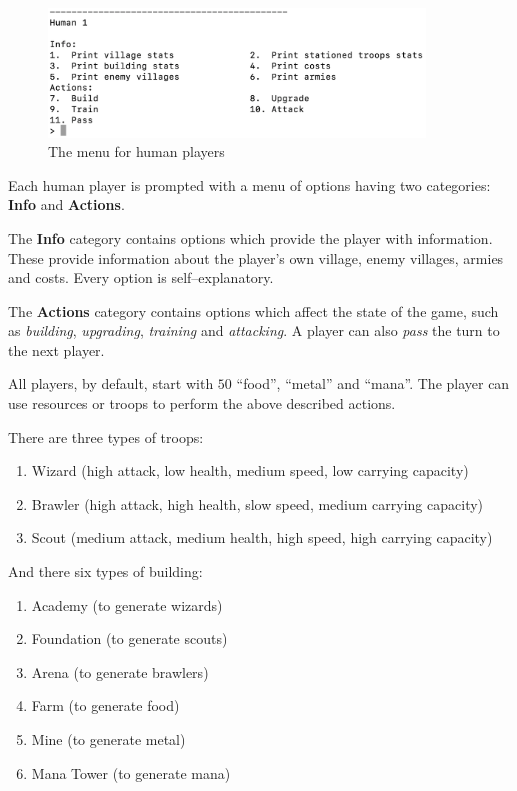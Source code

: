 \documentclass[12pt]{article}
\begin{document}
\begin{figure}[H]
    \centering
    \includegraphics[width=10cm]{./images/player-menu-village-war-game.png}
    \caption{The menu for human players}
    \label{player-menu-village-war-game}
\end{figure}

Each human player is prompted with a menu of options having two
categories: \textbf{Info} and \textbf{Actions}.

The \textbf{Info} category contains options which provide the
player with information. These provide information about the
player's own village, enemy villages, armies and costs. Every
option is self--explanatory.

The \textbf{Actions} category contains options which affect the
state of the game, such as \textit{building},
\textit{upgrading}, \textit{training} and \textit{attacking}. A
player can also \textit{pass} the turn to the next player.

All players, by default, start with $50$ ``food'', ``metal'' and
``mana''. The player can use resources or troops to perform the
above described actions.

There are three types of troops:

\begin{enumerate}
    \item Wizard (high attack, low health, medium speed, low
        carrying capacity)
    \item Brawler (high attack, high health, slow speed, medium
        carrying capacity)
    \item Scout (medium attack, medium health, high speed, high
        carrying capacity)
\end{enumerate}

And there six types of building:

\begin{enumerate}
    \item Academy (to generate wizards)
    \item Foundation (to generate scouts)
    \item Arena (to generate brawlers)
    \item Farm (to generate food)
    \item Mine (to generate metal)
    \item Mana Tower (to generate mana)
\end{enumerate}
\end{document}
